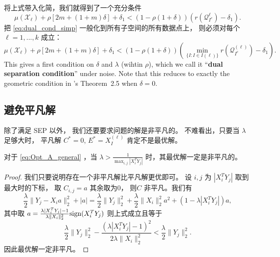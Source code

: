 \documentclass[main.tex]{subfiles}
\begin{document}
将上式带入化简，我们就得到了一个充分条件
\begin{equation}\label{eq:dual_cond_simp}
  \mu(\mathcal{X}_{\ell}) +\rho [2m+(1+m)\delta] +\delta_1
  < \left(1-\rho(1+\delta)\right)(r(\mathcal{Q}_{I^c}^{\ell})-\delta_1).
\end{equation}
把 \eqref{eq:dual_cond_simp} 一般化到所有子空间的所有数据点上，
则必须对每个$\ell = 1,...,k$ 成立：
\begin{equation}\label{eq:Thm1_all}
  \mu(\mathcal{X}_{\ell}) +\rho [2m+(1+m)\delta] +\delta_1
  < \left(1-\rho(1+\delta)\right)\left(\min_{\{I: I\in I(\ell)\}}r(\mathcal{Q}^{(\ell)}_{I^c})-\delta_1\right).
\end{equation}
This gives a first condition on $\delta$ and $\lambda$ (wihtin $\rho$), which we call it ``\textbf{dual separation condition}'' under noise. Note that this reduces to exactly the geometric condition in \cite{soltanolkotabi2011geometric}'s Theorem~2.5 when $\delta=0$.

\subsection{避免平凡解}\label{sec:avoid_trivial}
除了满足 SEP 以外， 我们还要要求问题的解是非平凡的。 不难看出，只要当 $\lambda$
足够大时， 平凡解 $C^* = 0$, $E^*=X_I^{(\ell)}$ 肯定不是最优解。

\begin{lemma}\label{lemma:avoid_trivial}
  对于 \eqref{eq:Opt_A_general} ，当 $\lambda > \frac{1}{\max_{i,j} |X_i^T
Y_j|}$ 时，其最优解一定是非平凡的。
\end{lemma}

\begin{proof}
  我们只要说明存在一个非平凡解比平凡解更优即可。 设 $i, j$ 为 $|X_i^T
  Y_j|$ 取到最大时的下标， 取 $C_{i,j} = a$ 其余取为$0$， 则$C$
  非平凡。我们有
  $$ \frac{\lambda}{2} \|Y_j - X_i a \|_2^2 + |a| = \frac{\lambda}{2}
  \|Y_j\|_2^2 + \frac{\lambda}{2} \|X_i\|_2^2 a^2 +\left( 1-\lambda |X_i^T Y_j|
  \right)a, $$
  其中取 $a = \frac{\lambda |X_i^T Y_j|-1}{\lambda \|X_i\|_2^2} \mathrm{sign}(X_i^T Y_j)$
  则上式成立且等于
  $$ \frac{\lambda}{2} \|Y_j\|_2^2 - \frac{(\lambda|X_i^T Y_j| -1)^2}
  {2 \lambda \|X_i\|_2^2 } < \frac{\lambda}{2} \|Y_j\|_2^2. $$
  因此最优解一定非平凡。
\end{proof}
\end{document}
